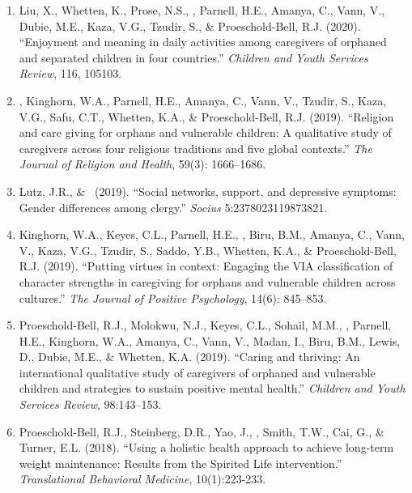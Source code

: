 \begin{enumerate}
\item Liu, X., Whetten, K., Prose, N.S., \Eagle, Parnell, H.E., Amanya, C., Vann, V., Dubie, M.E., Kaza, V.G., Tzudir, S., \& Proeschold-Bell, R.J. (2020). ``Enjoyment and meaning in daily activities among caregivers of orphaned and separated children in four countries.'' \emph{Children and Youth Services Review}, 116, 105103. 

\item \Eagle, Kinghorn, W.A., Parnell, H.E., Amanya, C., Vann, V., Tzudir, S., Kaza, V.G., Safu, C.T., Whetten, K.A., \& Proeschold-Bell, R.J. (2019). ``Religion and care giving for orphans and vulnerable children: A qualitative study of caregivers across four religious traditions and five global contexts.'' \emph{The Journal of Religion and Health}, 59(3): 1666--1686. 

\item Lutz, J.R., \& \Eagle\CS\ (2019). ``Social networks, support, and depressive symptoms: Gender differences among clergy.'' \emph{Socius} 5:2378023119873821. 

\item Kinghorn, W.A., Keyes, C.L., Parnell, H.E., \Eagle, Biru, B.M., Amanya, C., Vann, V., Kaza, V.G., Tzudir, S., Saddo, Y.B., Whetten, K.A., \& Proeschold-Bell, R.J. (2019). ``Putting virtues in context: Engaging the VIA classification of character strengths in caregiving for orphans and vulnerable children across cultures.'' \emph{The Journal of Positive Psychology}, 14(6): 845--853. 

\item Proeschold-Bell, R.J., Molokwu, N.J., Keyes, C.L., Sohail, M.M., \Eagle, Parnell, H.E., Kinghorn, W.A., Amanya, C., Vann, V., Madan, I., Biru, B.M., Lewis, D., Dubie, M.E., \& Whetten, K.A. (2019). ``Caring and thriving: An international qualitative study of caregivers of orphaned and vulnerable children and strategies to sustain positive mental health.''  \emph{Children and Youth Services Review}, 98:143--153.  

\item Proeschold-Bell, R.J., Steinberg, D.R., Yao, J., \Eagle, Smith, T.W., Cai, G., \& Turner, E.L. (2018). ``Using a holistic health approach to achieve long-term weight maintenance: Results from the Spirited Life intervention.'' \emph{Translational Behavioral Medicine}, 10(1):223-233. 


\end{enumerate}
